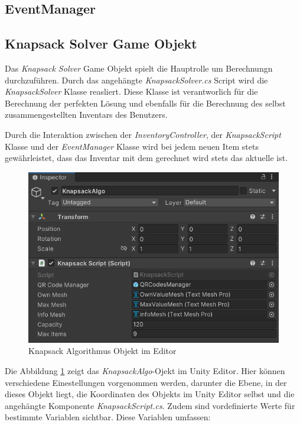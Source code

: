 \subsection{EventManager}

\subsection{Knapsack Solver Game Objekt}
Das \textit{Knapsack Solver} Game Objekt spielt die Hauptrolle um Berechnungn durchzuführen.
Durch das angehängte \textit{KnapsackSolver.cs} Script wird die \textit{KnapsackSolver} Klasse reasliert. Diese
Klasse ist verantworlich für die Berechnung der perfekten Lösung und ebenfalls für die Berechnung des selbst
zusammengestellten Inventars des Benutzers.

Durch die Interaktion zwischen der \textit{InventoryController}, der \textit{KnapsackScript} Klasse und der
\textit{EventManager} Klasse wird bei jedem neuen Item stets gewährleistet, dass das Inventar mit dem gerechnet wird
stets das aktuelle ist.\\

\begin{figure}[h]
    \centering
    \includegraphics[scale=0.8]{images/knapsackEditor}
    \caption{Knapsack Algorithmus Objekt im Editor}
    \label{fig:Knapsack_Editor}
\end{figure}

Die Abbildung \ref{fig:Knapsack_Editor} zeigt das \textit{KnapsackAlgo}-Ojekt im Unity Editor. Hier können verschiedene
Einestellungen vorgenommen werden, darunter die Ebene, in der dieses Objekt liegt, die Koordinaten des Objekts im
Unity Editor selbst und die angehängte Komponente \textit{KnapsackScript.cs}. Zudem sind vordefinierte Werte für
bestimmte Variablen sichtbar. Diese Variablen umfassen:

